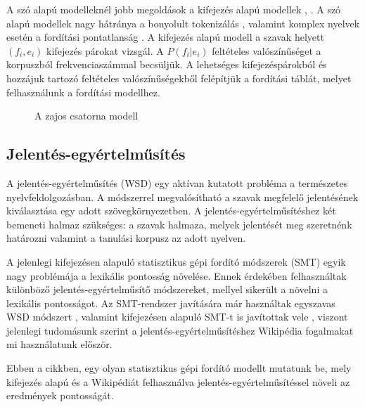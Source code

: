 A szó alapú modelleknél jobb megoldások a kifejezés alapú modellek \cite{Marcu:2002}, \cite{Och99improvedalignment}. A szó alapú modellek nagy hátránya a bonyolult tokenizálás \cite{Lopez07asurvey}, valamint komplex nyelvek esetén a fordítási pontatlanság \cite{Lopez07asurvey}. A kifejezés alapú modell a szavak helyett $(f_i, e_i)$ kifejezés párokat vizsgál. A $P(f_i|e_i)$ feltételes valószínűséget a korpuszból frekvenciaszámmal becsüljük. A lehetséges kifejezéspárokból és hozzájuk tartozó feltételes valószínűségekből felépítjük a fordítási táblát, melyet felhasználunk a fordítási modellhez.










\begin{figure}[b]
  	\centering
  	\caption[smt_translation_model]%
  	{A zajos csatorna modell}
 	\label{fig:modell:fig1}
\end{figure}


\subsection{Jelentés-egyértelműsítés}

A jelentés-egyértelműsítés (WSD) egy aktívan kutatott probléma a természetes nyelvfeldolgozásban. A módszerrel megvalósítható a szavak megfelelő jelentésének kiválasztása egy adott szövegkörnyezetben. A jelentés-egyértelműsítéshez két bemeneti halmaz szükséges: a szavak halmaza, melyek jelentését meg szeretnénk határozni valamint a tanulási korpusz az adott nyelven. 

A jelenlegi kifejezésen alapuló statisztikus gépi fordító módszerek (SMT) egyik nagy problémája a lexikális pontosság növelése. Ennek érdekében felhasználtak különböző jelentés-egyértelműsítő módszereket, mellyel sikerült a növelni a lexikális pontosságot. Az SMT-rendszer javítására már használtak egyszavas WSD módszert \cite{Carpuat06towardintegrating}, valamint kifejezésen alapuló SMT-t is javítottak vele \cite{Carpuat07improvingstatistical}, viszont jelenlegi tudomásunk szerint a jelentés-egyértelműsítéshez Wikipédia fogalmakat mi használatunk először. 



Ebben a cikkben, egy olyan statisztikus gépi fordító modellt mutatunk be, mely kifejezés alapú és a Wikipédiát felhasználva jelentés-egyértelműsítéssel növeli az eredmények pontosságát.